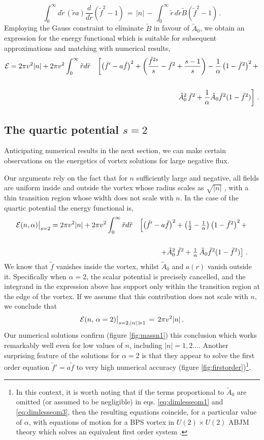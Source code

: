 \documentclass[12pt,a4paper]{article}
\def\be{\begin{equation}}
\def\ee{\end{equation}}
\newcommand{\bea}{\begin{eqnarray}}
\newcommand{\eea}{\end{eqnarray}}
\begin{document}
\be
\int_0^\infty d\tilde r \,\left(\tilde r a\right)\frac{d }{d\tilde r}\left(\tilde f^2-1\right)\,=\,|n|\,-\,\int_0^\infty \tilde r\, d\tilde r \tilde B(\tilde f^2-1)\,.
\ee
Employing the Gauss constraint to eliminate $\tilde B$ in favour of $\tilde A_0$, we obtain an expression for the energy functional which is suitable for subsequent approximations and matching with numerical results,
\bea
{\cal E} = 2\pi v^2 |n| +2\pi v^2\int_0^\infty \tilde r d\tilde r&&\left[\left(\tilde f'-a\tilde f\right)^2+\left(\frac{\tilde f^{2s}}{s}-\tilde f^2 +\frac{s-1}{s}\right)-\frac{1}{\alpha}\left(1-\tilde f^2\right)^2 +\right.\nonumber\\\label{energys}\\\nonumber
&&\left.\tilde A_0^2\,\tilde f^2+\frac{1}{\alpha}\tilde A_0 \tilde f^2(1-\tilde f^2)\right]\,. 
\eea
 \subsection{The quartic potential $s=2$}
Anticipating numerical results in the next section, we can make certain  observations on the energetics of vortex solutions for large negative flux. 

Our arguments rely on the fact that for $n$ sufficiently large and negative, all fields are uniform inside and outside the vortex whose radius scales as $\sqrt{|n|}$ , with a thin transition region whose width does not scale with $n$. In the case of the quartic potential the energy functional is, 
\bea
{\cal E}(n, \alpha)\big|_{s=2} = 2\pi v^2 |n| +2\pi v^2\int_0^\infty \tilde r d\tilde r&&\left[\left(\tilde f'-a\tilde f\right)^2+\left(\tfrac{1}
{2}-\tfrac{1}{\alpha}\right)\left(1-\tilde f^2\right)^2 +\right.\nonumber\\\label{energys2}\\\nonumber
&&\left.+\tilde A_0^2\,\tilde f^2+\tfrac{1}{\alpha}\,\tilde A_0 \tilde f^2(1-\tilde f^2)\right]\,. 
\eea
We know that $\tilde f$ vanishes inside the vortex, whilst $\tilde A_0$  and $a(r)$ vanish outside it.  Specifically when $\alpha=2$, the scalar potential is precisely cancelled, and the integrand in the expression above has support only within the transition region at the edge of the vortex. If we assume that this  contribution does not scale with $n$, we conclude that
\be
{\cal E}(n, \,\alpha=2)\big|_{s=2, |n|\gg1}\,=\, 2\pi v^2 |n|\,.
\ee
Our numerical solutions confirm (figure \ref{fig:massn1}) this conclusion which works remarkably well even for low values of $n$, including  $|n|=1,2 \ldots$. Another surprising feature of the solutions for $\alpha=2$ is that they appear to solve the first order equation $\tilde f'= a \tilde f$ to very high numerical accuracy (figure \ref{fig:firstorder})\footnote{In this context, it is worth noting that if the terms proportional to $\tilde A_0$ are omitted (or assumed to be negligible) in eqs. \eqref{eq:dimlesseom1} and \eqref{eq:dimlesseom3}, then the resulting equations coincide, for a particular value of $\alpha$, with equations of motion for a BPS vortex in $U(2)\times U(2)$ ABJM theory which solves an equivalent first order system \cite{Auzzi:2009es}.}.
\end{document}
